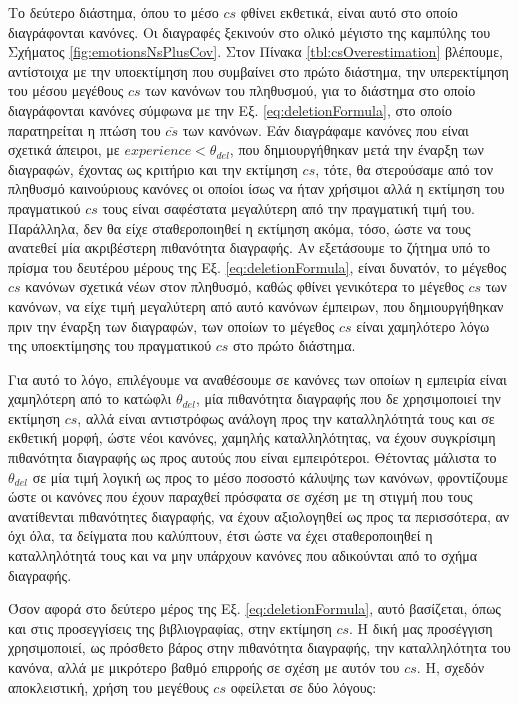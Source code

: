 Το δεύτερο διάστημα, όπου το μέσο $cs$ φθίνει εκθετικά, είναι αυτό στο οποίο διαγράφονται κανόνες. Οι διαγραφές ξεκινούν στο ολικό μέγιστο της καμπύλης του Σχήματος \ref{fig:emotionsNsPlusCov}. Στον Πίνακα \ref{tbl:csOverestimation} βλέπουμε, αντίστοιχα με την υποεκτίμηση που συμβαίνει στο πρώτο διάστημα, την υπερεκτίμηση του μέσου μεγέθους $cs$ των κανόνων του πληθυσμού, για το διάστημα στο οποίο διαγράφονται κανόνες σύμφωνα με την Εξ. \ref{eq:deletionFormula}, στο οποίο παρατηρείται η πτώση του $\overline{cs}$ των κανόνων. Εάν διαγράφαμε κανόνες που είναι σχετικά άπειροι, με $experience < \theta_{del}$, που δημιουργήθηκαν μετά την έναρξη των διαγραφών, έχοντας ως κριτήριο και την εκτίμηση $cs$, τότε, θα στερούσαμε από τον πληθυσμό καινούριους κανόνες οι οποίοι ίσως να ήταν χρήσιμοι αλλά η εκτίμηση του πραγματικού $cs$ τους είναι σαφέστατα μεγαλύτερη από την πραγματική τιμή του. Παράλληλα, δεν θα είχε σταθεροποιηθεί η εκτίμηση ακόμα, τόσο, ώστε να τους ανατεθεί μία ακριβέστερη πιθανότητα διαγραφής. Αν εξετάσουμε το ζήτημα υπό το πρίσμα του δευτέρου μέρους της Εξ. \ref{eq:deletionFormula}, είναι δυνατόν, το μέγεθος $cs$ κανόνων σχετικά νέων στον πληθυσμό, καθώς φθίνει γενικότερα το μέγεθος $cs$ των κανόνων, να είχε τιμή μεγαλύτερη από αυτό κανόνων έμπειρων, που δημιουργήθηκαν πριν την έναρξη των διαγραφών, των οποίων το μέγεθος $cs$ είναι χαμηλότερο λόγω της υποεκτίμησης του πραγματικού $cs$ στο πρώτο διάστημα.

Για αυτό το λόγο, επιλέγουμε να αναθέσουμε σε κανόνες των οποίων η εμπειρία είναι χαμηλότερη από το κατώφλι $\theta_{del}$, μία πιθανότητα διαγραφής που δε χρησιμοποιεί την εκτίμηση $cs$, αλλά είναι αντιστρόφως ανάλογη προς την καταλληλότητά τους και σε εκθετική μορφή, ώστε νέοι κανόνες, χαμηλής καταλληλότητας, να έχουν συγκρίσιμη πιθανότητα διαγραφής ως προς αυτούς που είναι εμπειρότεροι. Θέτοντας μάλιστα το $\theta_{del}$ σε μία τιμή λογική ως προς το μέσο ποσοστό κάλυψης των κανόνων, φροντίζουμε ώστε οι κανόνες που έχουν παραχθεί πρόσφατα σε σχέση με τη στιγμή που τους ανατίθενται πιθανότητες διαγραφής, να έχουν αξιολογηθεί ως προς τα περισσότερα, αν όχι όλα, τα δείγματα που καλύπτουν, έτσι ώστε να έχει σταθεροποιηθεί η καταλληλότητά τους και να μην υπάρχουν κανόνες που αδικούνται από το σχήμα διαγραφής.


Όσον αφορά στο δεύτερο μέρος της Εξ. \ref{eq:deletionFormula}, αυτό βασίζεται, όπως και στις προσεγγίσεις της βιβλιογραφίας, στην εκτίμηση $cs$. Η δική μας προσέγγιση χρησιμοποιεί, ως πρόσθετο βάρος στην πιθανότητα διαγραφής, την καταλληλότητα του κανόνα, αλλά με μικρότερο βαθμό επιρροής σε σχέση με αυτόν του $cs$. Η, σχεδόν αποκλειστική, χρήση του μεγέθους $cs$ οφείλεται σε δύο λόγους: 

